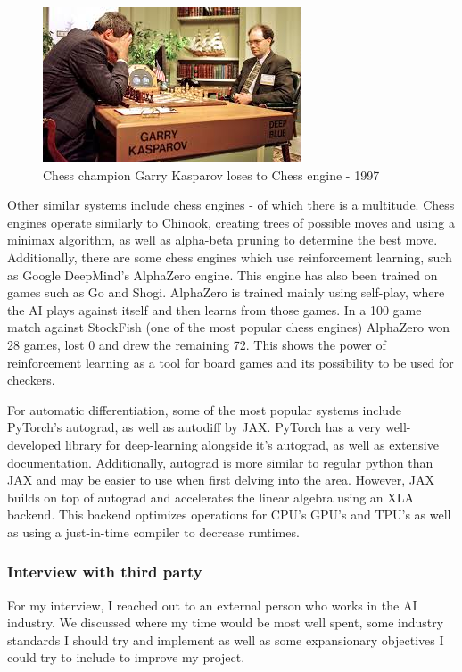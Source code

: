 \documentclass{article}
\begin{document}
    \begin{figure}
        \centering
        \includegraphics[scale=0.7]{download.jpg}
        \caption{Chess champion Garry Kasparov loses to Chess engine - 1997}
    \end{figure}
    Other similar systems include chess engines - of which there is a multitude. Chess engines operate similarly to Chinook, creating trees
    of possible moves and using a minimax algorithm, as well as alpha-beta pruning to determine the best move. Additionally, there are some
    chess engines which use reinforcement learning, such as Google DeepMind's AlphaZero engine. This engine has also been trained on games
    such as Go and Shogi. AlphaZero is trained mainly using self-play, where the AI plays against itself and then learns from those games.
    In a 100 game match against StockFish (one of the most popular chess engines) AlphaZero won 28 games, lost 0 and drew the remaining 72.
    This shows the power of reinforcement learning as a tool for board games and its possibility to be used for checkers.

    For automatic differentiation, some of the most popular systems include PyTorch's autograd, as well as autodiff by JAX. PyTorch has a very
    well-developed library for deep-learning alongside it's autograd, as well as extensive documentation. Additionally, autograd is more similar
    to regular python than JAX and may be easier to use when first delving into the area. However, JAX builds on top of autograd and accelerates
    the linear algebra using an XLA backend. This backend optimizes operations for CPU's GPU's and TPU's as well as using a just-in-time compiler
    to decrease runtimes.

    \subsubsection{Interview with third party}
    For my interview, I reached out to an external person who works in the AI industry. We discussed where my time would be most well spent,
    some industry standards I should try and implement as well as some expansionary objectives I could try to include to improve my project.
\end{document}
